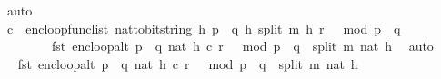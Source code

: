 \begin{isabellebody}
\ auto\isanewline
\isanewline
\ \ \isamarkupfalse%
\ \isamarkupfalse%
\ {\isachardoublequoteopen}c\ {\isacharequal}{\kern0pt}\ {\isacharparenleft}{\kern0pt}enc{\isacharunderscore}{\kern0pt}loop{\isacharunderscore}{\kern0pt}func{\isacharunderscore}{\kern0pt}list\ {\isacharparenleft}{\kern0pt}nat{\isacharunderscore}{\kern0pt}to{\isacharunderscore}{\kern0pt}bitstring\ h{\isacharcomma}{\kern0pt}\ p\ {\isacharasterisk}{\kern0pt}\ q{\isacharcomma}{\kern0pt}\ h{\isacharcomma}{\kern0pt}\ {\isacharparenleft}{\kern0pt}split\ m\ h{\isacharparenright}{\kern0pt}{\isacharparenright}{\kern0pt}\ {\isacharparenleft}{\kern0pt}r\ {\isacharcircum}{\kern0pt}\ {}\ mod\ {\isacharparenleft}{\kern0pt}p\ {\isacharasterisk}{\kern0pt}\ q{\isacharparenright}{\kern0pt}{\isacharparenright}{\kern0pt}{\isacharparenright}{\kern0pt}\ {\isasymLongrightarrow}\ \isanewline
\ \ \ \ \ \ \ \ fst\ {\isacharparenleft}{\kern0pt}enc{\isacharunderscore}{\kern0pt}loop{\isacharunderscore}{\kern0pt}alt\ {\isacharparenleft}{\kern0pt}p\ {\isacharasterisk}{\kern0pt}\ q{\isacharcomma}{\kern0pt}\ {\isacharparenleft}{\kern0pt}nat\ h{\isacharparenright}{\kern0pt}{\isacharcomma}{\kern0pt}\ c{\isacharparenright}{\kern0pt}\ {\isacharparenleft}{\kern0pt}r\ {\isacharcircum}{\kern0pt}\ {}\ mod\ {\isacharparenleft}{\kern0pt}p\ {\isacharasterisk}{\kern0pt}\ q{\isacharparenright}{\kern0pt}{\isacharparenright}{\kern0pt}{\isacharparenright}{\kern0pt}\ {\isacharequal}{\kern0pt}\ {\isacharparenleft}{\kern0pt}split\ m\ {\isacharparenleft}{\kern0pt}nat\ h{\isacharparenright}{\kern0pt}{\isacharparenright}{\kern0pt}{\isachardoublequoteclose}\ \isamarkupfalse%
\ auto\isanewline
\isanewline
\ \ \isamarkupfalse%
\ \isamarkupfalse%
\ {\isachardoublequoteopen}fst\ {\isacharparenleft}{\kern0pt}enc{\isacharunderscore}{\kern0pt}loop{\isacharunderscore}{\kern0pt}alt\ {\isacharparenleft}{\kern0pt}p\ {\isacharasterisk}{\kern0pt}\ q{\isacharcomma}{\kern0pt}\ {\isacharparenleft}{\kern0pt}nat\ h{\isacharparenright}{\kern0pt}{\isacharcomma}{\kern0pt}\ c{\isacharparenright}{\kern0pt}\ {\isacharparenleft}{\kern0pt}r\ {\isacharcircum}{\kern0pt}\ {}\ mod\ {\isacharparenleft}{\kern0pt}p\ {\isacharasterisk}{\kern0pt}\ q{\isacharparenright}{\kern0pt}{\isacharparenright}{\kern0pt}{\isacharparenright}{\kern0pt}\ {\isacharequal}{\kern0pt}\ {\isacharparenleft}{\kern0pt}split\ m\ {\isacharparenleft}{\kern0pt}nat\ h{\isacharparenright}{\kern0pt}{\isacharparenright}{\kern0pt}{\isachardoublequoteclose}\ \isanewline
\ \ \ \ \isamarkupfalse%

\end{isabellebody}
